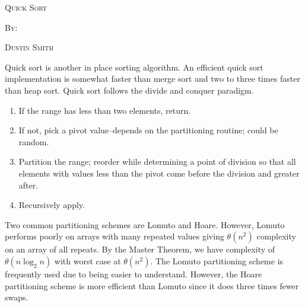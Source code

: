 \documentclass[12pt,dvipsnames,svgnames,x11names]{article}
\begin{document}
%
\pagecolor{gray!50}
\begin{center}
  \begin{center}
  \vspace*{\fill}
  \textsc{\LARGE Quick Sort}
  \par\bigskip
  \textsc{By:}
  \par\bigskip
  \textsc{\LARGE Dustin Smith}
  \vspace*{\fill}
\end{center}
\end{center}

\newpage

Quick sort is another in place sorting algorithm. An efficient quick sort implementation is somewhat 
faster than merge sort and two to three times faster than heap sort. Quick sort follows the divide and
conquer paradigm.
\begin{enumerate}
	\item If the range has less than two elements, return.
	\item If not, pick a pivot value--depends on the partitioning routine; could be random.
	\item Partition the range; reorder while determining a point of division so that all elements with values
	less than the pivot come before the division and greater after.
	\item Recursively apply.
\end{enumerate}
Two common partitioning schemes are Lomuto and Hoare. However, Lomuto performs poorly on arrays
with many repeated values giving \(\theta(n^2)\) complexity on an array of all repeats. By the Master 
Theorem, we have complexity of \(\theta(n\log_2 n)\) with worst case at \(\theta (n^2)\). The Lomuto 
partitioning scheme is frequently used due to being easier to understand. However, the Hoare partitioning
scheme is more efficient than Lomuto since it does three times fewer swaps.
\end{document}
